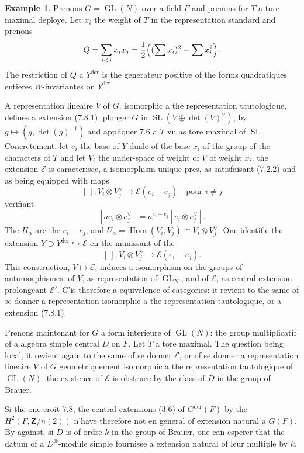 \documentclass[11pt,a4paper]{article}
\theoremstyle{plain}
\theoremstyle{definition}
\newtheorem{example}[theorem]{Example}
\DeclareMathOperator{\Hom}{Hom}
\DeclareMathOperator{\SL}{SL}
\DeclareMathOperator{\GL}{GL}
\DeclareMathOperator{\der}{der}
\begin{document}
\begin{example}\label{7.10}
Prenons $G = \GL(N)$ over a field $F$ and prenons for $T$ a tore maximal deploye. Let $x_i$ the weight of $T$ in the representation standard and prenons
\[
Q = \sum_{i < j} x_i x_j = \frac{1}{2}\Bigl((\sum x_i)^2 - \sum x_i^2\Bigr).
\]
The restriction of $Q$ a $Y^{\der}$ is the generateur positive of the forms quadratiques entieres $W$-invariantes on $Y^{\der}$.

A representation lineaire $V$ of $G$, isomorphic a the representation tautologique, defines a extension (7.8.1): plonger $G$ in $\SL(V \oplus \det(V)^\vee)$, by $g \mapsto (g, \det(g)^{-1})$ and appliquer 7.6 a $T$ vu as tore maximal of $\SL$. Concretement, let $e_i$ the base of $Y$ duale of the base $x_i$ of the group of the characters of $T$ and let $V_i$ the under-space of weight of $V$ of weight $x_i$. the extension $\mathscr{E}$ is caracterisee, a isomorphism unique pres, as satisfaisant (7.2.2) and as being equipped with maps
\[
[\,] : V_i \otimes V_j^\vee \to \mathscr{E}(e_i - e_j) \quad \text{pour } i \neq j
\]
verifiant
\[
[ae_i \otimes e_j^\vee] = a^{e_i - e_j} [e_i \otimes e_j^\vee].
\]
The $H_\alpha$ are the $e_i - e_j$, and $U_\alpha = \Hom(V_i, V_j) \cong V_i \otimes V_j^\vee$. One identifie the extension $Y \supset Y^{\der} \hookrightarrow \mathscr{E}$ en the munissant of the
\[
[\,] : V_i \otimes V_j^\vee \to \mathscr{E}(e_i - e_j).
\]
This construction, $V \mapsto \mathscr{E}$, induces a isomorphism on the groups of automorphismes: of $V$, as representation of $\GL_N$, and of $\mathscr{E}$, as central extension prolongeant $\mathscr{E}'$. C'is therefore a equivalence of categories: it revient to the same of se donner a representation isomorphic a the representation tautologique, or a extension (7.8.1).

Prenons maintenant for $G$ a form interieure of $\GL(N)$: the group multiplicatif of a algebra simple central $D$ on $F$. Let $T$ a tore maximal. The question being local, it revient again to the same of se donner $\mathscr{E}$, or of se donner a representation lineaire $V$ of $G$ geometriquement isomorphic a the representation tautologique of $\GL(N)$: the existence of $\mathscr{E}$ is obstruee by the class of $D$ in the group of Brauer.

Si the one croit 7.8, the central extensions (3.6) of $G^{\der}(F)$ by the $H^2(F, \mathbf{Z}/n(2))$ n'have therefore not en general of extension natural a $G(F)$. By against, si $D$ is of ordre $k$ in the group of Brauer, one can esperer that the datum of a $D^\otimes$-module simple fournisse a extension natural of leur multiple by $k$.
\end{example}
\end{document}
